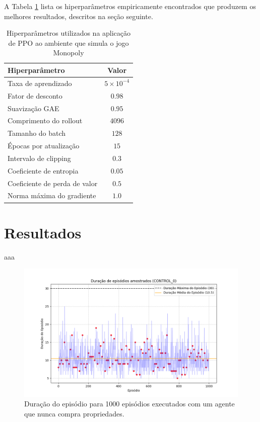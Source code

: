 \documentclass[conference]{IEEEtran}
\begin{document}
A Tabela \ref{tab:ppo_hyperparams} lista os hiperparâmetros empiricamente encontrados que produzem os melhores resultados, descritos na seção seguinte.

\newpage

\begin{table}[h!]
\caption{Hiperparâmetros utilizados na aplicação de PPO ao ambiente que simula o jogo Monopoly}
\begin{center}
\begin{tabular}{|l|c|}
\hline
\textbf{Hiperparâmetro}              & \textbf{Valor}    \\
\hline
Taxa de aprendizado                  & $5\times10^{-4}$  \\
\hline
Fator de desconto                    & $0.98$            \\
\hline
Suavização GAE                       & $0.95$            \\
\hline
Comprimento do rollout               & $4096$            \\
\hline
Tamanho do batch                     & $128$             \\
\hline
Épocas por atualização               & $15$              \\
\hline
Intervalo de clipping                & $0.3$             \\
\hline
Coeficiente de entropia              & $0.05$            \\
\hline
Coeficiente de perda de valor        & $0.5$             \\
\hline
Norma máxima do gradiente            & $1.0$             \\
\hline
\end{tabular}
\label{tab:ppo_hyperparams}
\end{center}
\end{table}


\section{Resultados}
\label{results}
aaa

\begin{figure}[htpb]
    \centering
    \includegraphics[width=1\linewidth]{figures/episode_lengths_control_0.png}
    \caption{Duração do episódio para 1000 episódios executados com um agente que nunca compra propriedades.}
    \label{fig:ep_lens_control_0}
\end{figure}
\end{document}
